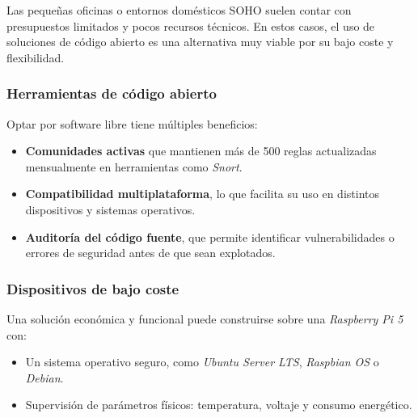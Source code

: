 \documentclass[11pt,a4paper,twoside]{report}
\begin{document}
Las pequeñas oficinas o entornos domésticos SOHO suelen contar con presupuestos limitados y pocos recursos técnicos. En estos casos, el uso de soluciones de código abierto es una alternativa muy viable por su bajo coste y flexibilidad.

\subsubsection{Herramientas de código abierto}

Optar por software libre tiene múltiples beneficios:

\begin{itemize}
	\item \textbf{Comunidades activas} que mantienen más de 500 reglas actualizadas mensualmente en herramientas como \textit{Snort}.
	\item \textbf{Compatibilidad multiplataforma}, lo que facilita su uso en distintos dispositivos y sistemas operativos.
	\item \textbf{Auditoría del código fuente}, que permite identificar vulnerabilidades o errores de seguridad antes de que sean explotados.
\end{itemize}


\subsubsection{Dispositivos de bajo coste}

Una solución económica y funcional puede construirse sobre una \textit{Raspberry Pi 5} con:

\begin{itemize}
	\item Un sistema operativo seguro, como \textit{Ubuntu Server LTS}, \textit{Raspbian OS} o \textit{Debian}.
	\item Supervisión de parámetros físicos: temperatura, voltaje y consumo energético.
\end{itemize}



\end{document}
